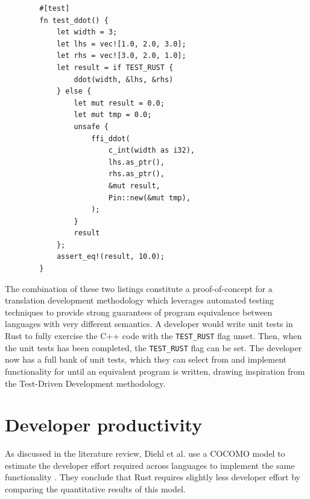 \begin{code}
    \begin{verbatim}
        #[test]
        fn test_ddot() {
            let width = 3;
            let lhs = vec![1.0, 2.0, 3.0];
            let rhs = vec![3.0, 2.0, 1.0];
            let result = if TEST_RUST {
                ddot(width, &lhs, &rhs)
            } else {
                let mut result = 0.0;
                let mut tmp = 0.0;
                unsafe {
                    ffi_ddot(
                        c_int(width as i32),
                        lhs.as_ptr(),
                        rhs.as_ptr(),
                        &mut result,
                        Pin::new(&mut tmp),
                    );
                }
                result
            };
            assert_eq!(result, 10.0);
        }
    \end{verbatim}
    \caption{.}
    \label{listing:rust-autocxx-unit-test}
\end{code}

The combination of these two listings constitute a proof-of-concept for a translation development methodology which leverages automated testing techniques to provide strong guarantees of program equivalence between languages with very different semantics. A developer would write unit tests in Rust to fully exercise the C++ code with the \texttt{TEST_RUST} flag unset. Then, when the unit tests has been completed, the \texttt{TEST_RUST} flag can be set. The developer now has a full bank of unit tests, which they can select from and implement functionality for until an equivalent program is written, drawing inspiration from the Test-Driven Development methodology.



\section{Developer productivity}
\label{sec:developer-productivity}

As discussed in the literature review, Diehl et al. use a COCOMO model to estimate the developer effort required across languages to implement the same functionality \cite{diehlBenchmarkingParallel1D2023}. They conclude that Rust requires slightly less developer effort by comparing the quantitative results of this model.

